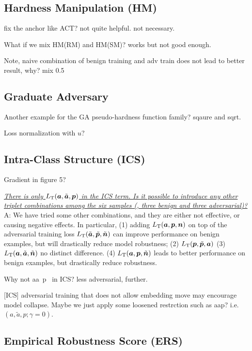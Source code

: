 \subsection{Hardness Manipulation (HM)}

	 fix the anchor like ACT?
		not quite helpful. not necessary.

	 What if we mix HM(RM) and HM(SM)?
		works but not good enough.

	 Note, naive combination of benign training and adv train does not lead to better result, why? mix 0.5

\subsection{Graduate Adversary}

	 Another example for the GA pseudo-hardness function family?
		sqaure and sqrt.

	 Loss normalization with $u$?

\subsection{Intra-Class Structure (ICS)}

	 Gradient in figure 5?

	\ul{\it There is only $L_\text{T}({\bm{a}}, \tilde{{\bm{a}}}, {\bm{p}})$ in the ICS
		term.  Is it possible to introduce any other triplet combinations among
		the six samples (\ie, three benign and three adversarial)?}\\
		A: We have tried some other combinations, and they are either not
		effective, or causing negative effects.
		In particular, (1) adding $L_\text{T}({\bm{a}}, {\bm{p}}, {\bm{n}})$ on top of the
		adversarial training loss
		$L_\text{T}(\tilde{{\bm{a}}},\tilde{{\bm{p}}},\tilde{{\bm{n}}})$ can improve
		performance on benign examples, but will drastically reduce model
		robustness;
		(2) $L_\text{T}({\bm{p}}, \tilde{{\bm{p}}}, {\bm{a}})$ 
		(3) $L_\text{T}({\bm{a}}, \tilde{{\bm{a}}}, \tilde{{\bm{n}}})$ no distinct difference.
		(4) $L_\text{T}({\bm{a}}, {\bm{p}}, \tilde{{\bm{n}}})$ leads to better performance
		on benign examples, but drastically reduce robustness.

	 Why not aa~p~ in ICS?
		less adversarial, further.

	 [ICS] adversarial training that does not allow embedding move may
		encourage model collapse. Maybe we just apply some loosened restrction
		such as aap? i.e. $(a,\tilde{a},p;\gamma=0)$.

\subsection{Empirical Robustness Score (ERS)}

